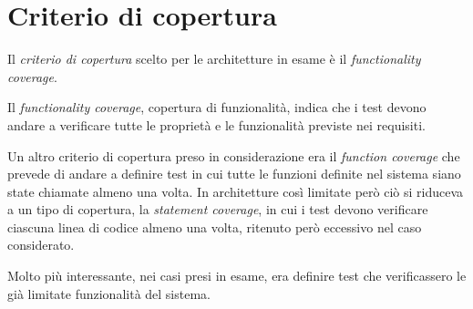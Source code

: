 \chapter{Criterio di copertura}

Il \emph{criterio di copertura} scelto per le architetture in esame è il \emph{functionality coverage}.

Il \emph{functionality coverage}, copertura di funzionalità, indica che i test devono andare a verificare tutte le proprietà e le funzionalità previste nei requisiti.

Un altro criterio di copertura preso in considerazione era il \emph{function coverage} che prevede di andare a definire test in cui tutte le funzioni definite nel sistema siano state chiamate almeno una volta. In architetture così limitate però ciò si riduceva a un tipo di copertura, la \emph{statement coverage}, in cui i test devono verificare ciascuna linea di codice almeno una volta, ritenuto però eccessivo nel caso considerato.

Molto più interessante, nei casi presi in esame, era definire test che verificassero le già limitate funzionalità del sistema.